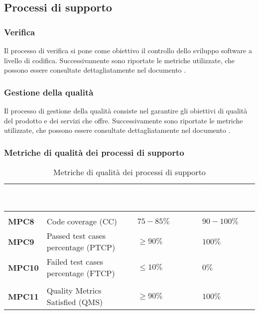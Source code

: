 \subsection{Processi di supporto}

\subsubsection{Verifica}
Il processo di verifica si pone come obiettivo il controllo dello sviluppo software a livello di codifica. Successivamente sono riportate le metriche utilizzate, che possono essere consultate dettagliatamente nel documento .

\subsubsection{Gestione della qualità}
Il processo di gestione della qualità consiste nel garantire gli obiettivi di qualità del prodotto e dei servizi che offre. Successivamente sono riportate le metriche utilizzate, che possono essere consultate dettagliatamente nel documento .

\subsubsection{Metriche di qualità dei processi di supporto}
{
\renewcommand{\arraystretch}{1.5}
\centering
\begin{longtable}{C{2.5cm} C{5.5cm} C{3.5cm} C{3.5cm}}
\textcolor{white}{\textbf{Codice}}&
\textcolor{white}{\textbf{Nome metrica}}&
\textcolor{white}{\textbf{Valore accettabile}}&
\textcolor{white}{\textbf{Valore ottimale}}\\
\hline
{}
 \\	
\endhead
\endfoot
{}\caption{Metriche di qualità dei processi di supporto}
\endlastfoot

\textbf{MPC8} & Code coverage (CC) & $ 75-85\% $  & $ 90-100 \% $ \\
\textbf{MPC9} & Passed test cases percentage (PTCP) & $ \geq 90\% $  & $ 100 \% $ \\
\textbf{MPC10} & Failed test cases percentage (FTCP) & $ \leq 10\% $  & $ 0 \% $ \\
 \\	
\textbf{MPC11} & Quality Metrics Satisfied (QMS) & $\geq 90\% $  & $ 100 \% $ \\

\end{longtable}
}

